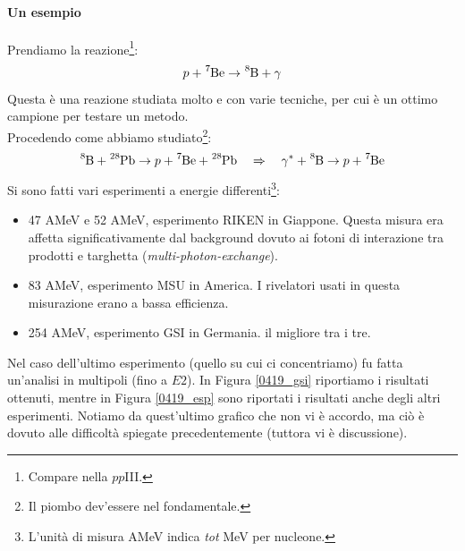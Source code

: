 \paragraph{Un esempio} Prendiamo la reazione\footnote{Compare nella $pp$III.}:
$$p+\ce{^7Be} \to \ce{^8B}+\gamma$$
Questa è una reazione studiata molto e con varie tecniche, per cui è un ottimo campione per testare un metodo.\\
Procedendo come abbiamo studiato\footnote{Il piombo dev'essere nel fondamentale.}:%
$$\ce{^8B} + \ce{^{28}Pb} \to p +  \ce{^7Be} + \ce{^{28}Pb} \quad \Rightarrow \quad \gamma^* + \ce{^8B} \to p+ \ce{^7Be}$$
Si sono fatti vari esperimenti a energie differenti\footnote{L'unità di misura AMeV indica \textit{tot} MeV per nucleone.}:
\begin{itemize}
	\item 47 AMeV e 52 AMeV, esperimento RIKEN in Giappone. Questa misura era affetta significativamente dal background dovuto ai fotoni di interazione tra prodotti e targhetta (\textit{multi-photon-exchange}).
	\item 83 AMeV, esperimento MSU in America. I rivelatori usati in questa misurazione erano a bassa efficienza.
	\item 254 AMeV, esperimento GSI in Germania.  il migliore tra i tre.
\end{itemize}
\noindent Nel caso dell'ultimo esperimento (quello su cui ci concentriamo) fu fatta un'analisi in multipoli (fino a $E2$). In Figura \ref{0419_gsi} riportiamo i risultati ottenuti, mentre in Figura \ref{0419_esp} sono riportati i risultati anche degli altri esperimenti. Notiamo da quest'ultimo grafico che non vi è accordo, ma ciò è dovuto alle difficoltà spiegate precedentemente (tuttora vi è discussione).

